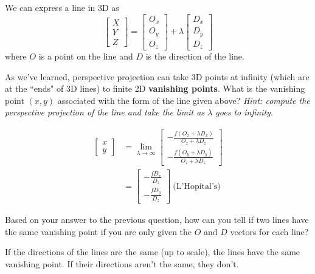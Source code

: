 \begin{blocksection}
\question We can express a line in 3D as
$$
\begin{bmatrix}X \\ Y \\ Z\end{bmatrix} =
\begin{bmatrix}O_x \\ O_y \\ O_z\end{bmatrix} +
\lambda \begin{bmatrix}D_x \\ D_y \\ D_z\end{bmatrix}$$
where $O$ is a point on the line and $D$ is the direction of the line.

As we've learned, perspective projection can take 3D points at infinity (which are at the ``ends" of 3D lines) to finite 2D {\bf vanishing points}. What is the vanishing point $(x, y)$ associated with the form of the line given above? {\it Hint: compute the perspective projection of the line and take the limit as $\lambda$ goes to infinity.}

\begin{solution}[0.75in]
\begin{align*}
\begin{bmatrix}x \\ y\end{bmatrix} &=
\lim_{\lambda \rightarrow \infty}
\begin{bmatrix}-\frac{f(O_x + \lambda D_x)}{O_z + \lambda D_z} \\[6pt] -\frac{f(O_y + \lambda D_y)}{O_z + \lambda D_z}\end{bmatrix} \\
&= \begin{bmatrix}-\frac{fD_x}{D_z} \\[6pt] -\frac{fD_y}{D_z}\end{bmatrix}~\text{(L'Hopital's)}
\end{align*}
\end{solution}
\end{blocksection}


\begin{blocksection}
\question Based on your answer to the previous question, how can you tell if two lines have the same vanishing point if you are only given the $O$ and $D$ vectors for each line?

\begin{solution}[0.75in]
If the directions of the lines are the same (up to scale), the lines have the same vanishing point. If their directions aren't the same, they don't.
\end{solution}
\end{blocksection}
